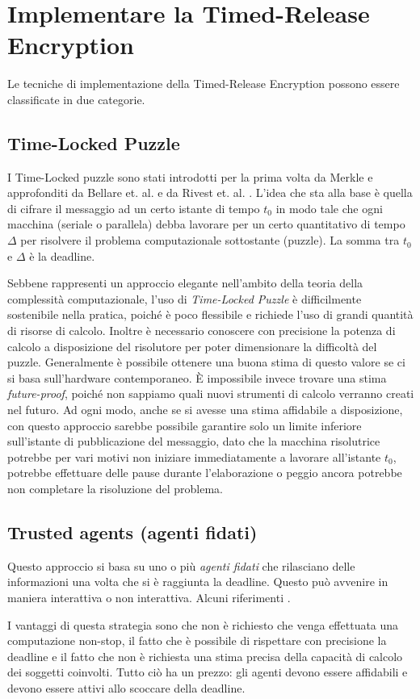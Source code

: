 \section{Implementare la Timed-Release Encryption}
Le tecniche di implementazione della Timed-Release Encryption possono essere classificate
in due categorie.

\subsection{Time-Locked Puzzle}
I Time-Locked puzzle sono stati introdotti per la prima volta
da Merkle \cite{Merkle:1978:SCO:359460.359473} e approfonditi
da Bellare et. al. \cite{Bellare:1996:EKE:888619}
e da Rivest et. al. \cite{Rivest96time-lockpuzzles}.
L'idea che sta alla base è quella di cifrare il messaggio ad un certo istante di tempo $ t_0 $
in modo tale che ogni macchina
(seriale o parallela) debba lavorare per un certo quantitativo di tempo $ \Delta $ per risolvere
il problema computazionale sottostante (puzzle). La somma tra $ t_0 $ e $ \Delta $ è la deadline.

Sebbene rappresenti un approccio elegante nell'ambito della teoria della complessità computazionale,
l'uso di \textit{Time-Locked Puzzle} è difficilmente sostenibile nella pratica,
poiché è poco flessibile e richiede l'uso di
grandi quantità di risorse di calcolo. Inoltre è necessario conoscere con
precisione la potenza di calcolo a disposizione del risolutore per poter
dimensionare la difficoltà del puzzle. Generalmente è possibile ottenere
una buona stima di questo valore se ci si basa sull'hardware contemporaneo. È impossibile
invece trovare una stima \textit{future-proof}, poiché non sappiamo quali nuovi strumenti di
calcolo verranno creati nel futuro.
Ad ogni modo, anche se si avesse una stima affidabile a disposizione,
con questo approccio sarebbe possibile garantire solo un limite inferiore
sull'istante di pubblicazione del messaggio, dato che la macchina risolutrice potrebbe per vari motivi
non iniziare immediatamente a lavorare all'istante $ t_0 $,
potrebbe effettuare delle pause durante l'elaborazione
o peggio ancora potrebbe non completare la risoluzione del problema.


\subsection{Trusted agents (agenti fidati)}
\label{subsec:trusted-agents}
Questo approccio si basa su uno o più \textit{agenti fidati} che rilasciano
delle informazioni una volta che si è raggiunta la deadline. Questo può avvenire in
maniera interattiva o non interattiva. Alcuni riferimenti
\cite{time-capsule-signature, 10.1007/11602897_25, 10.1007/3-540-48910-X_6,
	10.1007/11889663_17, 10.1007/978-3-642-15317-4_1, 10.1145/1330332.1330336}.

I vantaggi di questa strategia sono che non è richiesto che venga effettuata una computazione non-stop,
il fatto che è possibile di rispettare con precisione la deadline e il fatto che non è richiesta una stima precisa
della capacità di calcolo dei soggetti coinvolti. Tutto ciò ha un prezzo: gli agenti devono
essere affidabili e devono essere attivi allo scoccare della deadline.

